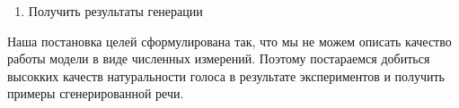 \documentclass[../diploma.tex]{subfiles}
\begin{document}
\begin{enumerate}[resume]
    \item Получить результаты генерации
\end{enumerate}

Наша постановка целей сформулирована так, что мы не можем описать качество работы модели в виде численных измерений.
Поэтому постараемся добиться высокких качеств натуральности голоса в результате экспериментов и получить примеры сгенерированной речи.

\end{document}
